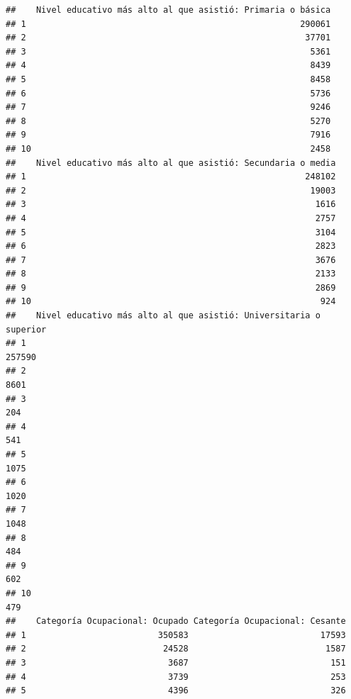 \documentclass[11pt,]{article}
\begin{document}
\begin{verbatim}
##    Nivel educativo más alto al que asistió: Primaria o básica
## 1                                                      290061
## 2                                                       37701
## 3                                                        5361
## 4                                                        8439
## 5                                                        8458
## 6                                                        5736
## 7                                                        9246
## 8                                                        5270
## 9                                                        7916
## 10                                                       2458
##    Nivel educativo más alto al que asistió: Secundaria o media
## 1                                                       248102
## 2                                                        19003
## 3                                                         1616
## 4                                                         2757
## 5                                                         3104
## 6                                                         2823
## 7                                                         3676
## 8                                                         2133
## 9                                                         2869
## 10                                                         924
##    Nivel educativo más alto al que asistió: Universitaria o superior
## 1                                                             257590
## 2                                                               8601
## 3                                                                204
## 4                                                                541
## 5                                                               1075
## 6                                                               1020
## 7                                                               1048
## 8                                                                484
## 9                                                                602
## 10                                                               479
##    Categoría Ocupacional: Ocupado Categoría Ocupacional: Cesante
## 1                          350583                          17593
## 2                           24528                           1587
## 3                            3687                            151
## 4                            3739                            253
## 5                            4396                            326

\end{verbatim}
\end{document}
